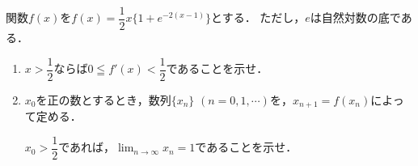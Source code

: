 \documentclass[../../main.tex]{subfiles}
\begin{document}
関数$f(x)$を$\displaystyle f(x)=\dfrac{1}{2}x \{ 1+e^{-2(x-1)} \}$とする．
ただし，$e$は自然対数の底である．
\begin{enumerate}
  \item $\displaystyle x>\dfrac{1}{2}$ならば$\displaystyle 0 \leqq f'(x) < \dfrac{1}{2}$であることを示せ．
  \item $x_0$を正の数とするとき，数列$\{ x_n \}$ $(n=0,1,\cdots)$を，$x_{n+1}=f(x_n)$によって定める．

    $\displaystyle x_0>\dfrac{1}{2}$であれば，$\displaystyle \lim_{n\to\infty}x_n=1$であることを示せ．
\end{enumerate}
\end{document}
